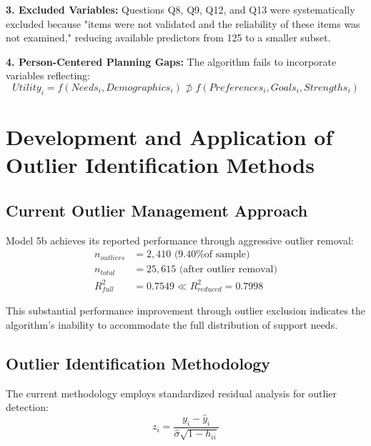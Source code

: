 \textbf{3. Excluded Variables:}
Questions Q8, Q9, Q12, and Q13 were systematically excluded because "items were not validated and the reliability of these items was not examined," reducing available predictors from 125 to a smaller subset.

\textbf{4. Person-Centered Planning Gaps:}
The algorithm fails to incorporate variables reflecting:
\begin{equation}
Utility_i = f(Needs_i, Demographics_i) \not\supset f(Preferences_i, Goals_i, Strengths_i)
\end{equation}

\section{Development and Application of Outlier Identification Methods}

\subsection{Current Outlier Management Approach}

Model 5b achieves its reported performance through aggressive outlier removal:
\begin{align}
n_{outliers} &= 2,410 \text{ (9.40\% of sample)} \\
n_{total} &= 25,615 \text{ (after outlier removal)} \\
R^2_{full} &= 0.7549 \ll R^2_{reduced} = 0.7998
\end{align}

This substantial performance improvement through outlier exclusion indicates the algorithm's inability to accommodate the full distribution of support needs.

\subsection{Outlier Identification Methodology}

The current methodology employs standardized residual analysis for outlier detection:
\begin{equation}
z_i = \frac{y_i - \hat{y}_i}{\hat{\sigma} \sqrt{1 - h_{ii}}}
\end{equation}

